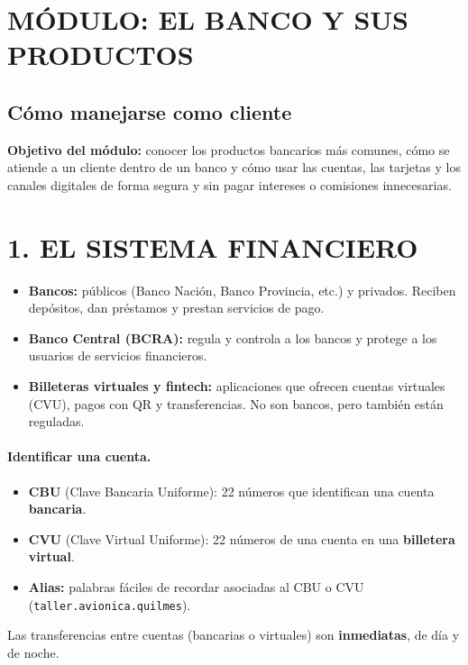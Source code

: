 \clearpage
\section*{MÓDULO: EL BANCO Y SUS PRODUCTOS}
\subsection*{Cómo manejarse como cliente}

\begin{recuadro}
\textbf{Objetivo del módulo:} conocer los productos bancarios más comunes, cómo se atiende a
un cliente dentro de un banco y cómo usar las cuentas, las tarjetas y los canales digitales de
forma segura y sin pagar intereses o comisiones innecesarias.
\end{recuadro}

\section*{1. EL SISTEMA FINANCIERO}

\begin{itemize}
  \item \textbf{Bancos:} públicos (Banco Nación, Banco Provincia, etc.) y privados. Reciben
        depósitos, dan préstamos y prestan servicios de pago.
  \item \textbf{Banco Central (BCRA):} regula y controla a los bancos y protege a los
        usuarios de servicios financieros.
  \item \textbf{Billeteras virtuales y fintech:} aplicaciones que ofrecen cuentas virtuales
        (CVU), pagos con QR y transferencias. No son bancos, pero también están reguladas.
\end{itemize}

\paragraph*{Identificar una cuenta.}
\begin{itemize}
  \item \textbf{CBU} (Clave Bancaria Uniforme): 22 números que identifican una cuenta
        \textbf{bancaria}.
  \item \textbf{CVU} (Clave Virtual Uniforme): 22 números de una cuenta en una
        \textbf{billetera virtual}.
  \item \textbf{Alias:} palabras fáciles de recordar asociadas al CBU o CVU
        (\texttt{taller.avionica.quilmes}).
\end{itemize}
Las transferencias entre cuentas (bancarias o virtuales) son \textbf{inmediatas}, de día y de
noche.

